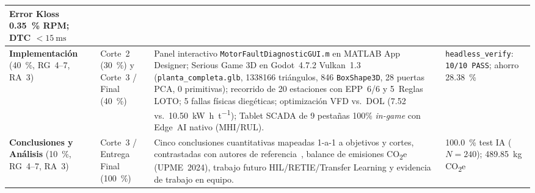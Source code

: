 \begin{table}[t]
\begin{tabularx}{\textwidth}{@{} >{\raggedright\arraybackslash}p{2.85cm} >{\raggedright\arraybackslash}p{2.55cm} >{\raggedright\arraybackslash}X >{\raggedright\arraybackslash}p{2.45cm} @{}}
Error Kloss \qty{0.35}{\percent} RPM; DTC $<\qty{15}{\milli\second}$ \\
\midrule
\textbf{Implementaci\'on} (\qty{40}{\percent}, RG~4--7, RA~3) &
Corte~2 (\qty{30}{\percent}) y Corte~3 / Final (\qty{40}{\percent}) &
Panel interactivo \texttt{MotorFaultDiagnosticGUI.m} en MATLAB App Designer; Serious Game 3D en Godot~4.7.2 Vulkan~1.3 (\texttt{planta\_\allowbreak completa.glb}, \num{1338166} tri\'angulos, 846 \texttt{BoxShape3D}, 28 puertas PCA, 0 primitivas); recorrido de 20 estaciones con EPP~6/6 y 5~Reglas LOTO; 5 fallas f\'isicas dieg\'eticas; optimizaci\'on VFD vs.\ DOL (\num{7.52} vs.\ \qty{10.50}{\kilo\watt\hour\per\tonne}); Tablet SCADA de 9 pesta\~nas 100\% \emph{in-game} con Edge~AI nativo (MHI/RUL). &
\texttt{headless\_\allowbreak verify}: \texttt{10/10 PASS}; ahorro \qty{28.38}{\percent} \\
\midrule
\textbf{Conclusiones y An\'alisis} (\qty{10}{\percent}, RG~4--7, RA~3) &
Corte~3 / Entrega Final (\qty{100}{\percent}) &
Cinco conclusiones cuantitativas mapeadas 1-a-1 a objetivos y cortes, contrastadas con autores de referencia~\cite{Singh2023,Thermal2025,Gangsar2020,Soualhi2022,AI2026,Resa2019,Adamou2024,Breque2021,Xu2021,Stefan2023,Stefan2024,UPME2024}, balance de emisiones CO\textsubscript{2}e (UPME~2024), trabajo futuro HIL/RETIE/Transfer Learning y evidencia de trabajo en equipo. &
\qty{100.0}{\percent} test IA ($N=240$); \qty{489.85}{\kilogram}\,CO\textsubscript{2}e \\
\bottomrule
\end{tabularx}
\end{table}
